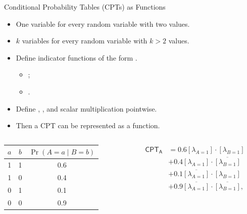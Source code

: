 \documentclass{beamer}
\begin{document}
\begin{frame}{Conditional Probability Tables (CPTs) as Functions}
  \begin{itemize}
  \item \alert{One} variable for every random variable with \alert{two} values.
  \item \alert{$k$} variables for every random variable with \alert{$k > 2$}
    values.
  \item Define indicator functions of the form .
    \begin{itemize}
    \item {};
    \item {}.
    \end{itemize}
  \item Define \structure{$+$}, \structure{$\cdot$}, and scalar multiplication pointwise.
  \item Then a CPT can be represented as a function.
  \end{itemize}
  \begin{columns}[t]
    \begin{column}{0.5\textwidth}
      \centering
      \begin{tabular}[t]{ccc}
        \toprule
        $a$ & $b$ & $\Pr(A = a \mid B = b)$ \\
        \midrule
        1 & 1 & 0.6 \\
        1 & 0 & 0.4 \\
        0 & 1 & 0.1 \\
        0 & 0 & 0.9 \\
        \bottomrule
      \end{tabular}
    \end{column}
    \begin{column}{0.5\textwidth}
      \begin{align*}
        \mathsf{CPT_A} &= 0.6[\lambda_{A=1}] \cdot [\lambda_{B=1}] \\
                       &+ 0.4[\lambda_{A=1}] \cdot \overline{[\lambda_{B=1}]} \\
                       &+ 0.1\overline{[\lambda_{A=1}]} \cdot [\lambda_{B=1}] \\
                       &+ 0.9\overline{[\lambda_{A=1}]} \cdot \overline{[\lambda_{B=1}]},
      \end{align*}
    \end{column}
  \end{columns}
\end{frame}
\end{document}
